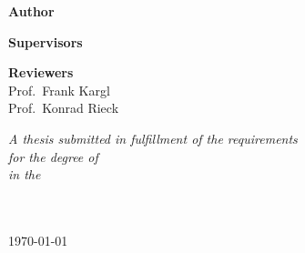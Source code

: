 \documentclass[
11pt, %
english, %
singlespacing, %
headsepline, %
]{MastersDoctoralThesis} %
\begin{document}
\begin{titlepage}
\begin{center}
\begin{minipage}[t]{0.45\textwidth}
\begin{flushleft} \large
\textbf{Author}\\
\authorname
\end{flushleft}
\end{minipage}
\begin{minipage}[t]{0.45\textwidth}
\begin{flushright} \large
\textbf{Supervisors}\\
\supname
\end{flushright}
\end{minipage}

\vspace{1.5cm}

\begin{center}
\large
\textbf{Reviewers}\\
Prof.\ Frank Kargl\\
Prof.\ Konrad Rieck
\end{center}

 
\vfill

\large \textit{A thesis submitted in fulfillment of the requirements\\ for the degree of \degreename}\\[0.3cm] %
\textit{in the}\\[0.4cm]
\groupname\\\deptname\\[2cm] %
 
\vfill

{\large \today}\\[4cm] %
 
\vfill
\end{center}
\end{titlepage}


\end{document}
